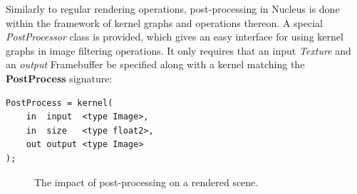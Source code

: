 Similarly to regular rendering operations, post-processing in Nucleus is done within the framework of kernel graphs and operations thereon. A special \emph{PostProcessor} class is provided, which gives an easy interface for using kernel graphs in image filtering operations. It only requires that an input \emph{Texture} and an \emph{output} Framebuffer be specified along with a kernel matching the \textbf{PostProcess} signature:

\noindent\begin{minipage}{\textwidth}
\begin{lstlisting}[frame=single]
PostProcess = kernel(
    in  input  <type Image>,
    in  size   <type float2>,
    out output <type Image>
);
\end{lstlisting}
\end{minipage}

\begin{figure}[ht!]
  \centering
  \caption[The impact of post-processing]{The impact of post-processing on a rendered scene.}
\label{fig:lppFalloffBetterCase}
\end{figure}

